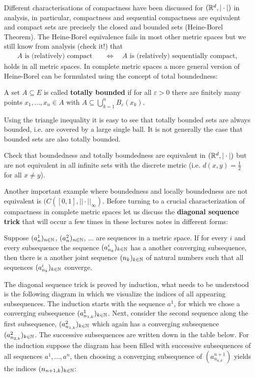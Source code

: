 Different characterisations of compactness have been discussed for $(\mathbb{R}^d,|\cdot|)$ in analysis, in particular, compactness and sequential compactness are equivalent and compact sets are precisely the closed and bounded sets (Heine-Borel Theorem). The Heine-Borel equivalence fails in most other metric spaces but we still know from analysis (check it!) that
\begin{align*}
	A\text{ is (relatively) compact}\quad& \Longleftrightarrow \quad A\text{ is (relatively) sequentially compact},
\end{align*}
holds in all metric spaces. In complete metric spaces a more general version of Heine-Borel can be formulated using the concept of total boundedness:
\begin{ldef}
\begin{deff}
	A set $A\subseteq E$ is called \textbf{totally bounded} if for all $\varepsilon>0$ there are finitely many points $x_1,...,x_n\in A$ with $A \subseteq \bigcup\limits_{k=1}^n B_{\varepsilon}(x_k)$. 
\end{deff}
\end{ldef}	
Using the triangle inequality it is easy to see that totally bounded sets are always bounded, i.e. are covered by a large single ball. It is not generally the case that bounded sets are also totally bounded.
\begin{luebung}
	Check that boundedness and totally boundedness are equivalent in $(\mathbb{R}^d,|\cdot|)$ but are not equivalent in all infinite sets with the discrete metric (i.e. $d(x,y)=\frac{1}{2}$ for all $x\neq y$).
\end{luebung}
Another important example where boundedness and locally boundedness are not equivalent is $(C([0,1],||\cdot||_\infty)$. Before turning to a crucial characterization of compactness in complete metric spaces let us discuss the \textbf{diagonal sequence trick} that will occur a few times in these lectures notes in different forms:
\begin{ltrick}
	Suppose $(a^1_{n})_{n\in\mathbb{N}}$, $(a^2_{n})_{n\in\mathbb{N}}$, ... are sequences in a metric space. If for every $i$ and every subsequence the sequence $(a^i_{n_k})_{k\in\mathbb{N}}$ has a another converging subsequence, then there is a another joint sequence $(n_k)_{k\in\mathbb{N}}$ of natural numbers such that all sequences $(a^i_{n_k})_{k\in\mathbb{N}}$ converge.
\end{ltrick}
The diagonal sequence trick is proved by induction, what needs to be understood is the following diagram in which we visualize the indices of all appearing subsequences. The induction starts with the sequence $a^1$, for which we chose a converging subsequence $(a^1_{n_{1,k}})_{k\in\mathbb{N}}$. Next, consider the second sequence along the first subsequence, $(a^2_{n_{1,k}})_{k\in\mathbb{N}}$ which again has a converging subsequence $(a^2_{n_{2,k}})_{k\in\mathbb{N}}$. The successive subsequences are written down in the table below. For the induction suppose the diagram has been filled with successive subsequences of all sequences $a^1,..., a^n$, then choosing a converging subsequence of $(a^{n+1}_{n_{n,k}})$ yields the indices $(n_{n+1,k})_{k\in\mathbb{N}}$:
